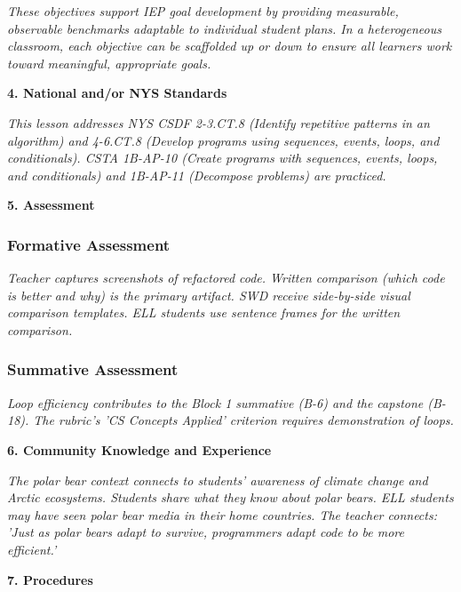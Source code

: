 \documentclass[11pt,letterpaper]{article}
\begin{document}
\textit{These objectives support IEP goal development by providing measurable, observable benchmarks adaptable to individual student plans. In a heterogeneous classroom, each objective can be scaffolded up or down to ensure all learners work toward meaningful, appropriate goals.}

\textbf{4. National and/or NYS Standards}

\textit{This lesson addresses NYS CSDF 2-3.CT.8 (Identify repetitive patterns in an algorithm) and 4-6.CT.8 (Develop programs using sequences, events, loops, and conditionals). CSTA 1B-AP-10 (Create programs with sequences, events, loops, and conditionals) and 1B-AP-11 (Decompose problems) are practiced.}

\newpage
\textbf{5. Assessment}

\subsubsection{Formative Assessment}

\textit{Teacher captures screenshots of refactored code. Written comparison (which code is better and why) is the primary artifact. SWD receive side-by-side visual comparison templates. ELL students use sentence frames for the written comparison.}

\subsubsection{Summative Assessment}

\textit{Loop efficiency contributes to the Block 1 summative (B-6) and the capstone (B-18). The rubric's 'CS Concepts Applied' criterion requires demonstration of loops.}

\textbf{6. Community Knowledge and Experience}

\textit{The polar bear context connects to students' awareness of climate change and Arctic ecosystems. Students share what they know about polar bears. ELL students may have seen polar bear media in their home countries. The teacher connects: 'Just as polar bears adapt to survive, programmers adapt code to be more efficient.'}

\textbf{7. Procedures}
\end{document}
